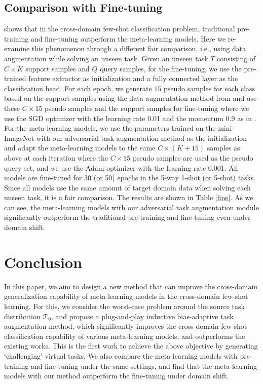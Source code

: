 \documentclass{article}
\begin{document}
\subsection{Comparison with Fine-tuning}\label{fine_tune}
\cite{guo2020broader} shows that in the cross-domain few-shot classification problem, traditional pre-training and fine-tuning outperform the meta-learning models. Here we re-examine this phenomenon through a different fair comparison, i.e., using data augmentation while solving an unseen task. Given an unseen task $T$ consisting of $C\times K$ support samples and $Q$ query samples, for the fine-tuning, we use the pre-trained feature extractor as initialization and a fully connected layer as the classification head. For each epoch, we generate $15$ pseudo samples for each class based on the support samples using the data augmentation method from \cite{yeh2020large} and use these $C\times15$ pseudo samples and the support samples for fine-tuning where we use the SGD optimizer with the learning rate 0.01 and the momentum 0.9 as in \cite{guo2020broader}. For the meta-learning models, we use the parameters trained on the mini-ImageNet with our adversarial task augmentation method as the initialization and adapt the meta-learning models to the same $C\times(K+15)$ samples as above at each iteration where the $C\times 15$ pseudo samples are used as the pseudo query set, and we use the Adam optimizer with the learning rate 0.001. All models are fine-tuned for 30 (or 50) epochs in the 5-way 1-shot (or 5-shot) tasks. Since all models use the same amount of target domain data when solving each unseen task, it is a fair comparison. The results are shown in Table \ref{fine}. As we can see, the meta-learning models with our adversarial task augmentation module significantly outperform the traditional pre-training and fine-tuning even under domain shift.

\section{Conclusion}
In this paper, we aim to design a new method that can improve the cross-domain generalization capability of meta-learning models in the cross-domain few-shot learning. For this, we consider the worst-case problem around the source task distribution $\mathcal{T}_0$, and propose a plug-and-play inductive bias-adaptive task augmentation method, which significantly improves the cross-domain few-shot classification capability of various meta-learning models, and outperforms the existing works. This is the first work to achieve the above objective by generating ‘challenging’ virtual tasks. We also compare the meta-learning models with pre-training and fine-tuning under the same settings, and find that the meta-learning models with our method outperform the fine-tuning under domain shift.



\end{document}
